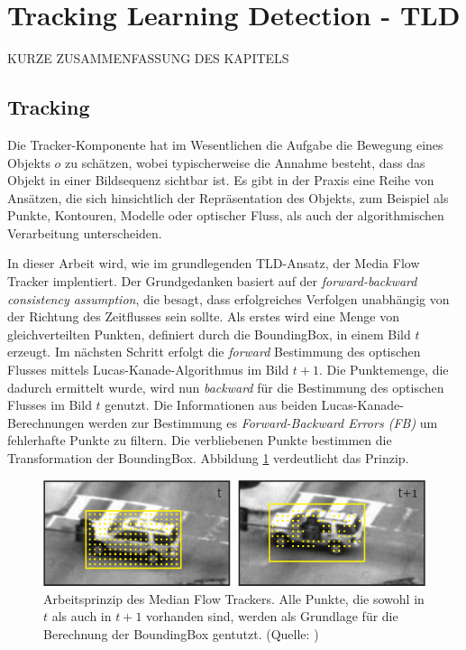\section{Tracking Learning Detection - TLD}
KURZE ZUSAMMENFASSUNG DES KAPITELS
\subsection{Tracking}
Die Tracker-Komponente hat im Wesentlichen die Aufgabe die Bewegung eines Objekts $o$ zu schätzen, wobei typischerweise die Annahme besteht, dass das Objekt in einer Bildsequenz sichtbar ist. Es gibt in der Praxis eine Reihe von Ansätzen, die sich hinsichtlich der Repräsentation des Objekts, zum Beispiel als Punkte, Kontouren, Modelle oder optischer Fluss, als auch der algorithmischen Verarbeitung unterscheiden.

In dieser Arbeit wird, wie im grundlegenden TLD-Ansatz, der Media Flow Tracker\cite{key-3} implentiert. Der Grundgedanken basiert auf der\textit{ forward-backward consistency assumption}, die besagt, dass erfolgreiches Verfolgen unabhängig von der Richtung des Zeitflusses sein sollte. Als erstes wird eine Menge von gleichverteilten Punkten, definiert durch die BoundingBox, in einem Bild $t$ erzeugt. Im nächsten Schritt erfolgt die \textit{forward} Bestimmung des optischen Flusses mittels Lucas-Kanade-Algorithmus\cite{OPT} im Bild $t+1$. Die Punktemenge, die dadurch ermittelt wurde, wird nun \textit{backward} für die Bestimmung des optischen Flusses im Bild $t$ genutzt. Die Informationen aus beiden Lucas-Kanade-Berechnungen werden zur Bestimmung es \textit{Forward-Backward Errors (FB)} um fehlerhafte Punkte zu filtern. Die verbliebenen Punkte bestimmen die Transformation der BoundingBox. Abbildung \ref{fig:MFT} verdeutlicht das Prinzip.

\begin{figure}
\centering{}\includegraphics[scale=0.7]{../pictures/MediaFlow_0.png}\caption[Arbeitsweise des Median Flow Trackers]{Arbeitsprinzip des Median Flow Trackers. Alle Punkte, die sowohl in $t$ als auch in $t+1$ vorhanden sind, werden als Grundlage für die Berechnung der BoundingBox gentutzt. (Quelle: \cite{key-3})\label{fig:MFT} }
\end{figure}

